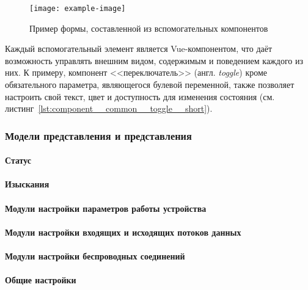 \begin{figure}[h!]
  \centering
  \setlength{\fboxsep}{5pt}
  \texttt{[image: example-image]}
  \vspace*{6pt}
  \caption{Пример формы, составленной из вспомогательных компонентов}
  \label{fig:form-example}
\end{figure}

Каждый вспомогательный элемент является Vue-компонентом, что даёт возможность управлять внешним видом, содержимым и поведением каждого из них. К примеру, компонент <<переключатель>> (англ. \emph{toggle}) кроме обязательного параметра, являющегося булевой переменной, также позволяет настроить свой текст, цвет и доступность для изменения состояния (см. листинг~\ref{lst:component__common__toggle__short}).

\newpage




\subsubsection{Модели представления и представления}

\paragraph{Статус}

\paragraph{Изыскания}

\paragraph{Модули настройки параметров работы устройства}

\paragraph{Модули настройки входящих и исходящих потоков данных}

\paragraph{Модули настройки беспроводных соединений}

\paragraph{Общие настройки}

\newpage
